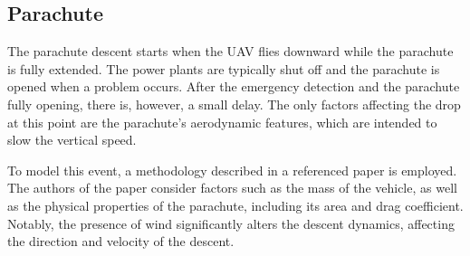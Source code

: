 \documentclass[12pt]{report}
\begin{document}
        \subsection{Parachute}
        The parachute descent starts when the UAV flies downward while the parachute is fully extended. The power plants
        are typically shut off and the parachute is opened when a problem occurs. After the emergency detection and the
        parachute fully opening, there is, however, a small delay. The only factors affecting the drop at this point are
        the parachute's aerodynamic features, which are intended to slow the vertical speed.
            
        To model this event, a methodology described in a referenced paper \cite{la_cour-harbo_quantifying_2019}is employed. The authors of the paper
        consider factors such as the mass of the vehicle, as well as the physical properties of the parachute, including
        its area and drag coefficient. Notably, the presence of wind significantly alters the descent dynamics,
        affecting the direction and velocity of the descent.
\end{document}
